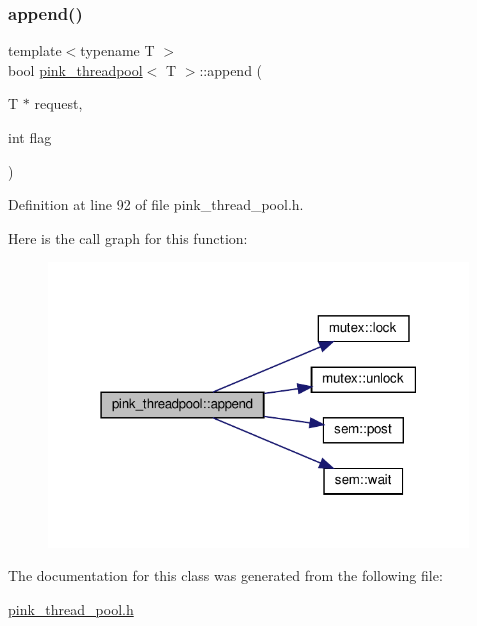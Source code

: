 \subsubsection{\texorpdfstring{append()}{append()}}
{\footnotesize\ttfamily template$<$typename T $>$ \\
bool \hyperlink{classpink__threadpool}{pink\+\_\+threadpool}$<$ T $>$\+::append (\begin{DoxyParamCaption}\item[{T $\ast$}]{request,  }\item[{int}]{flag }\end{DoxyParamCaption})}



Definition at line 92 of file pink\+\_\+thread\+\_\+pool.\+h.

Here is the call graph for this function\+:
\nopagebreak
\begin{figure}[H]
\begin{center}
\leavevmode
\includegraphics[width=316pt]{classpink__threadpool_ae4bead5c98203b97c3caeae43296d295_cgraph}
\end{center}
\end{figure}


The documentation for this class was generated from the following file\+:\begin{DoxyCompactItemize}
\item 
\hyperlink{pink__thread__pool_8h}{pink\+\_\+thread\+\_\+pool.\+h}\end{DoxyCompactItemize}
